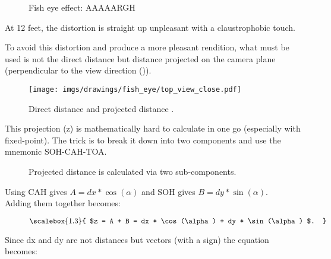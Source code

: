 \begin{minipage}{\textwidth}
 \begin{figure}[H]
\centering
 \caption{Fish eye effect: AAAAARGH} \label{fig:mips}
 \end{figure}
 

\begin{minipage}{.4\textwidth}
At 12 feet, the distortion is straight up unpleasant with a claustrophobic touch.\\
\par
To avoid this distortion and produce a more pleasant rendition, what must be used is not the direct distance  but distance projected on the camera plane (perpendicular to the view direction ()).
 \end{minipage}
\begin{minipage}{.6\textwidth}
 \begin{figure}[H]
  \begin{flushright}
  \texttt{[image: imgs/drawings/fish\_eye/top\_view\_close.pdf]}
 \end{flushright}
\end{figure}
 \end{minipage}
\end{minipage}
\par



\begin{figure}[H]

 
\label{fig:Raycasting2}
 \caption{Direct distance  and projected distance .}
\end{figure}

This projection (z) is mathematically hard to calculate in one go (especially with fixed-point). The trick is to break it down into two components and use the mnemonic SOH-CAH-TOA.\\


\begin{figure}[H]
\centering
 
 \caption{Projected distance  is calculated via two sub-components.}
\end{figure}
Using CAH gives $A = dx * \cos(\alpha)$ and SOH gives $B = dy * \sin(\alpha) $.\\

Adding them together becomes:
\par
\begin{figure}[H]
  \centering
  \begin{equation*}
    \scalebox{1.3}{
$z = A + B = dx * \cos(\alpha) + dy * \sin(\alpha) $. 
 }
  \end{equation*}
\end{figure}
Since dx and dy are not distances but vectors (with a sign) the equation becomes: 


